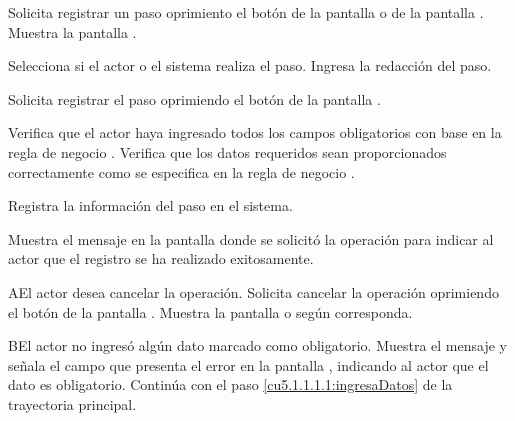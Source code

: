  \begin{UCtrayectoria}
	\UCpaso[\UCactor] Solicita registrar un paso oprimiento el botón  de la pantalla  o de la pantalla . 
	\UCpaso[\UCsist] Muestra la pantalla . 
	
	\UCpaso[\UCactor] Selecciona si el actor o el sistema realiza el paso.\label{cu5.1.1.1.1:ingresaDatos}
	\UCpaso[\UCactor] Ingresa la redacción del paso.
	
	\UCpaso[\UCactor] Solicita registrar el paso oprimiendo el botón  de la pantalla .  
	
	\UCpaso[\UCsist] Verifica que el actor haya ingresado todos los campos obligatorios con base en la regla de negocio . 
	\UCpaso[\UCsist] Verifica que los datos requeridos sean proporcionados correctamente como se especifica en la regla de negocio .  
	
	\UCpaso[\UCsist] Registra la información del paso en el sistema.
	
	\UCpaso[\UCsist] Muestra el mensaje  en la pantalla donde se solicitó la operación
	para indicar al actor que el registro se ha realizado exitosamente.
    
\end{UCtrayectoria}

    
 \begin{UCtrayectoriaA}{A}{El actor desea cancelar la operación.}
    \UCpaso[\UCactor] Solicita cancelar la operación oprimiendo el botón  de la pantalla .
    \UCpaso[\UCsist] Muestra la pantalla  o  según corresponda.
 \end{UCtrayectoriaA}
 
 \begin{UCtrayectoriaA}{B}{El actor no ingresó algún dato marcado como obligatorio.}
    \UCpaso[\UCsist] Muestra el mensaje  y señala el campo que presenta el error en la pantalla 
	    , indicando al actor que el dato es obligatorio.
    \UCpaso[] Continúa con el paso \ref{cu5.1.1.1.1:ingresaDatos} de la trayectoria principal.
 \end{UCtrayectoriaA}
 
